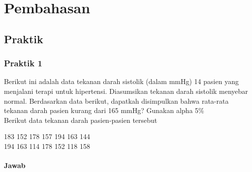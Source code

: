 \documentclass[a4paper,12pt]{article}
\begin{document}
\section{Pembahasan}
\subsection{Praktik}
\subsubsection{Praktik 1}
Berikut ini adalah data tekanan darah sistolik (dalam mmHg) 14 pasien yang menjalani terapi untuk hipertensi. Diasumsikan tekanan darah sistolik menyebar normal. Berdasarkan data berikut, dapatkah disimpulkan bahwa rata-rata tekanan darah pasien kurang dari 165 mmHg? Gunakan alpha 5\%\\
Berikut data tekanan darah pasien-pasien tersebut\\
\begin{center}
    183 152 178 157 194 163 144\\
    194 163 114 178 152 118 158
\end{center}

\paragraph{Jawab\\}
\end{document}
